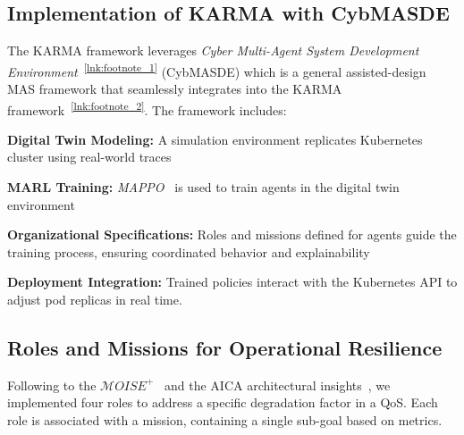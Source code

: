 \documentclass[conference]{IEEEtran}
\begin{document}
\subsection{Implementation of KARMA with CybMASDE}



The KARMA framework leverages \textit{Cyber Multi-Agent System Development Environment}~\textsuperscript{\ref{lnk:footnote_1}} (CybMASDE) which is a general assisted-design MAS framework that seamlessly integrates into the KARMA framework~\textsuperscript{\ref{lnk:footnote_2}}.
The framework includes:
\begin{enumerate*}[label=\textbf{\arabic*)}, itemjoin={;\quad }]
    \item \textbf{Digital Twin Modeling:} A simulation environment replicates Kubernetes cluster using real-world traces
    \item \textbf{MARL Training:} \textit{MAPPO}~\cite{Yu2022} is used to train agents in the digital twin environment
    \item \textbf{Organizational Specifications:} Roles and missions defined for agents guide the training process, ensuring coordinated behavior and explainability
    \item \textbf{Deployment Integration:} Trained policies interact with the Kubernetes API to adjust pod replicas in real time.
\end{enumerate*}

\subsection{Roles and Missions for Operational Resilience}

\noindent Following to the $\mathcal{M}OISE^+$~\cite{hubner2002moise} and the AICA architectural insights~\cite{kott2018autonomous}, we implemented four roles to address a specific degradation factor in a QoS.
Each role is associated with a mission, containing a single sub-goal based on metrics.
\end{document}
